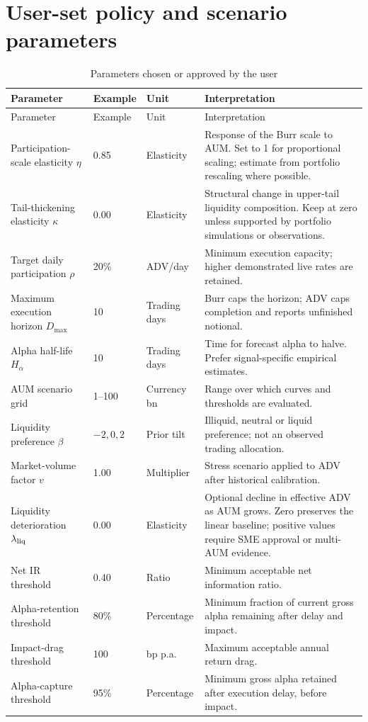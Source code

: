 \documentclass[11pt,a4paper]{article}
\numberwithin{equation}{section}
\begin{document}
\section{User-set policy and scenario parameters}
\begin{longtable}{@{}p{}p{}p{}p{}@{}}
\caption{Parameters chosen or approved by the user}\label{tab:policy}\\
\toprule
Parameter & Example & Unit & Interpretation\\
\midrule
\endfirsthead
\toprule
Parameter & Example & Unit & Interpretation\\
\midrule
\endhead
Participation-scale elasticity $\eta$ & 0.85 & Elasticity & Response of the Burr scale to AUM. Set to 1 for proportional scaling; estimate from portfolio rescaling where possible.\\
Tail-thickening elasticity $\kappa$ & 0.00 & Elasticity & Structural change in upper-tail liquidity composition. Keep at zero unless supported by portfolio simulations or observations.\\
Target daily participation $\rho$ & 20\% & ADV/day & Minimum execution capacity; higher demonstrated live rates are retained.\\
Maximum execution horizon $D_{\max}$ & 10 & Trading days & Burr caps the horizon; ADV caps completion and reports unfinished notional.\\
Alpha half-life $H_\alpha$ & 10 & Trading days & Time for forecast alpha to halve. Prefer signal-specific empirical estimates.\\
AUM scenario grid & 1--100 & Currency bn & Range over which curves and thresholds are evaluated.\\
Liquidity preference $\beta$ & $-2,0,2$ & Prior tilt & Illiquid, neutral or liquid preference; not an observed trading allocation.\\
Market-volume factor $v$ & 1.00 & Multiplier & Stress scenario applied to ADV after historical calibration.\\
Liquidity deterioration $\lambda_{\rm liq}$ & 0.00 & Elasticity & Optional decline in effective ADV as AUM grows. Zero preserves the linear baseline; positive values require SME approval or multi-AUM evidence.\\
Net IR threshold & 0.40 & Ratio & Minimum acceptable net information ratio.\\
Alpha-retention threshold & 80\% & Percentage & Minimum fraction of current gross alpha remaining after delay and impact.\\
Impact-drag threshold & 100 & bp p.a. & Maximum acceptable annual return drag.\\
Alpha-capture threshold & 95\% & Percentage & Minimum gross alpha retained after execution delay, before impact.\\
\bottomrule
\end{longtable}
\end{document}
